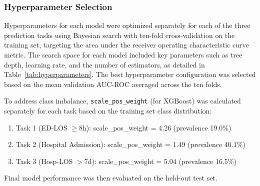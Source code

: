 \documentclass[harvard,article]{frontiersinFPHY_FAMS}
\begin{document}
\subsubsection{Hyperparameter Selection}

Hyperparameters for each model were optimized separately for each of the three prediction tasks using Bayesian search with ten-fold cross-validation on the training set, targeting the area under the receiver operating characteristic curve metric. The search space for each model included key parameters such as tree depth, learning rate, and the number of estimators, as detailed in Table~\ref{tab:hyperparameters}. The best hyperparameter configuration was selected based on the mean validation AUC-ROC averaged across the ten folds.

To address class imbalance, \texttt{scale\_pos\_weight} (for XGBoost) was calculated separately for each task based on the training set class distribution:
\begin{enumerate}
    

\item Task 1 (ED-LOS $\geq$8h): scale\_pos\_weight = 4.26 (prevalence 19.0\%)
\item Task 2 (Hospital Admission): scale\_pos\_weight = 1.49 (prevalence 40.1\%)
\item Task 3 (Hosp-LOS $>$7d): scale\_pos\_weight = 5.04 (prevalence 16.5\%)
\end{enumerate}

Final model performance was then evaluated on the held-out test set.
\end{document}

